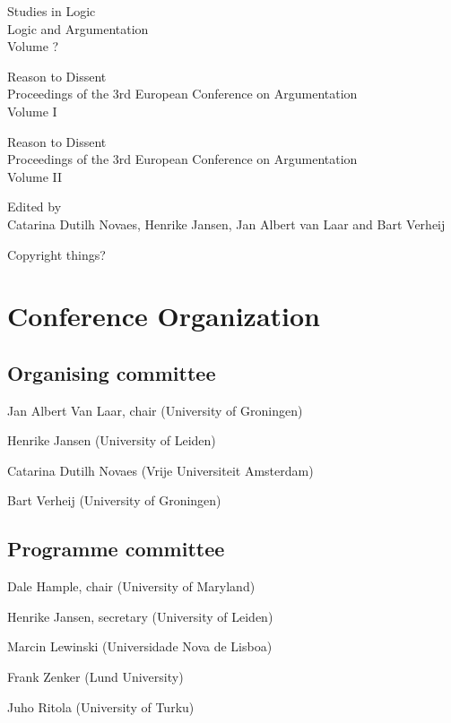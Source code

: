 \newpage
\begin{center}
Studies in Logic\\
Logic and Argumentation\\
Volume ?
\vspace{10cm}

Reason to Dissent\\
Proceedings of the 3rd European Conference on Argumentation\\
Volume I
\end{center}

\newpage

\newpage

\begin{center}
Reason to Dissent\\
Proceedings of the 3rd European Conference on Argumentation\\
Volume II
\vspace{10cm}

Edited by\\
Catarina Dutilh Novaes, Henrike Jansen, Jan Albert van Laar and Bart Verheij
\end{center}

\newpage

Copyright things?

\newpage

\section*{Conference Organization}
	\subsection*{Organising committee}
	\begin{compactitem}[]
		\item[] Jan Albert Van Laar, chair (University of Groningen)
		\item[] Henrike Jansen (University of Leiden)
		\item[] Catarina Dutilh Novaes (Vrije Universiteit Amsterdam)
		\item[] Bart Verheij (University of Groningen)
	\end{compactitem}

	\subsection*{Programme committee}
	\begin{compactitem}[]
		\item[] Dale Hample, chair (University of Maryland)
		\item[] Henrike Jansen, secretary (University of Leiden)
		\item[] Marcin Lewinski (Universidade Nova de Lisboa)
		\item[] Frank Zenker (Lund University)
		\item[] Juho Ritola (University of Turku)
 	\end{compactitem}

